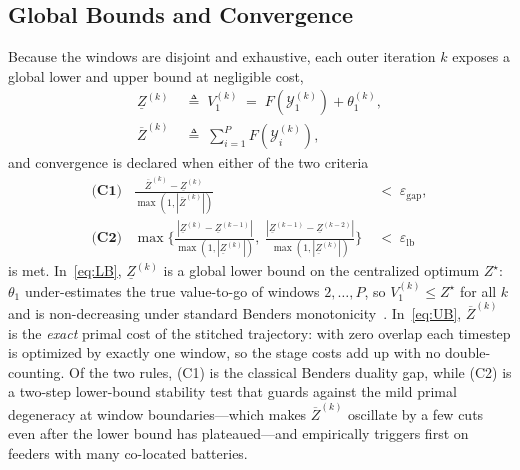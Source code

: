 \subsection{Global Bounds and Convergence}
\label{ssec:bounds}

Because the windows are disjoint and exhaustive, each outer iteration
$k$ exposes a global lower and upper bound at negligible cost,
\begin{align}
\underline{Z}^{(k)} \;&\triangleq\; V_1^{(k)}
\;=\; F(\mathcal{Y}_1^{(k)}) + \theta_1^{(k)},
\label{eq:LB}\\[2pt]
\overline{Z}^{(k)} \;&\triangleq\; \sum_{i=1}^{P} F(\mathcal{Y}_i^{(k)}),
\label{eq:UB}
\end{align}
and convergence is declared when either of the two criteria
\begin{align}
\textbf{(C1)}\;\;\;
\frac{\overline{Z}^{(k)} - \underline{Z}^{(k)}}
     {\max(1,|\overline{Z}^{(k)}|)} &\;<\; \varepsilon_{\text{gap}},
\label{eq:cv_gap}\\[2pt]
\textbf{(C2)}\;\;\;
\max\!\Big\{\!
\tfrac{|\underline{Z}^{(k)}{-}\underline{Z}^{(k-1)}|}{\max(1,|\underline{Z}^{(k)}|)},\;
\tfrac{|\underline{Z}^{(k-1)}{-}\underline{Z}^{(k-2)}|}{\max(1,|\underline{Z}^{(k)}|)}\!
\Big\} &\;<\; \varepsilon_{\text{lb}}
\label{eq:cv_lb}
\end{align}
is met. In~\eqref{eq:LB}, $\underline{Z}^{(k)}$ is a global lower bound
on the centralized optimum $Z^\star$: $\theta_1$ under-estimates the
true value-to-go of windows $2,\dots,P$, so $V_1^{(k)}\le Z^\star$ for
all $k$ and is non-decreasing under standard Benders
monotonicity~\cite{XX}. In~\eqref{eq:UB}, $\overline{Z}^{(k)}$ is the
\emph{exact} primal cost of the stitched trajectory: with zero overlap
each timestep is optimized by exactly one window, so the stage costs add
up with no double-counting. Of the two rules, (C1) is the classical
Benders duality gap, while (C2) is a two-step lower-bound stability test
that guards against the mild primal degeneracy at window
boundaries---which makes $\overline{Z}^{(k)}$ oscillate by a few cuts
even after the lower bound has plateaued---and empirically triggers
first on feeders with many co-located batteries.

